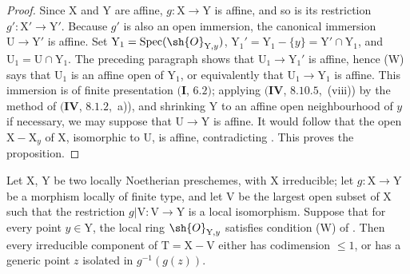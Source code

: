 \begin{proof}
Since $\mathrm{X}$ and $\mathrm{Y}$ are affine, $g:\mathrm{X}\to\mathrm{Y}$ is affine, and so is its restriction $g':\mathrm{X}'\to\mathrm{Y}'$.  Because $g'$ is also an open immersion, the canonical immersion $\mathrm{U}\to\mathrm{Y}'$ is affine.
Set $\mathrm{Y}_1=\operatorname{Spec}(\sh{O}_{\mathrm{Y},y})$, $\mathrm{Y}_1'=\mathrm{Y}_1-\{y\}=\mathrm{Y}'\cap\mathrm{Y}_1$, and $\mathrm{U}_1=\mathrm{U}\cap\mathrm{Y}_1$.  The preceding paragraph shows that $\mathrm{U}_1\to\mathrm{Y}_1'$ is affine, hence (W) says that $\mathrm{U}_1$ is an affine open of $\mathrm{Y}_1$, or equivalently that $\mathrm{U}_1\to\mathrm{Y}_1$ is affine.
This immersion is of finite presentation $(\mathbf{I}$, $6.2)$; applying $(\mathbf{IV}$, $8.10.5$,~(viii)) by the method of $(\mathbf{IV}$, $8.1.2$,~a)), and shrinking $\mathrm{Y}$ to an affine open neighbourhood of $y$ if necessary, we may suppose that $\mathrm{U}\to\mathrm{Y}$ is affine.  It would follow that the open $\mathrm{X}-\mathrm{X}_y$ of $\mathrm{X}$, isomorphic to $\mathrm{U}$, is affine, contradicting .  This proves the proposition.
\end{proof}

\begin{corollary}[21.12.11]
\label{IV.21.12.11}
Let $\mathrm{X}$, $\mathrm{Y}$ be two locally Noetherian preschemes, with $\mathrm{X}$ irreducible; let $g:\mathrm{X}\to\mathrm{Y}$ be a morphism locally of finite type, and let $\mathrm{V}$ be the largest open subset of $\mathrm{X}$ such that the restriction $g|\mathrm{V}:\mathrm{V}\to\mathrm{Y}$ is a local isomorphism.
Suppose that for every point $y\in\mathrm{Y}$, the local ring $\sh{O}_{\mathrm{Y},y}$ satisfies condition \textup{(W)} of .
Then every irreducible component of $\mathrm{T}=\mathrm{X}-\mathrm{V}$ either has codimension $\leq1$, or has a generic point $z$ isolated in $g^{-1}(g(z))$.
\end{corollary}

